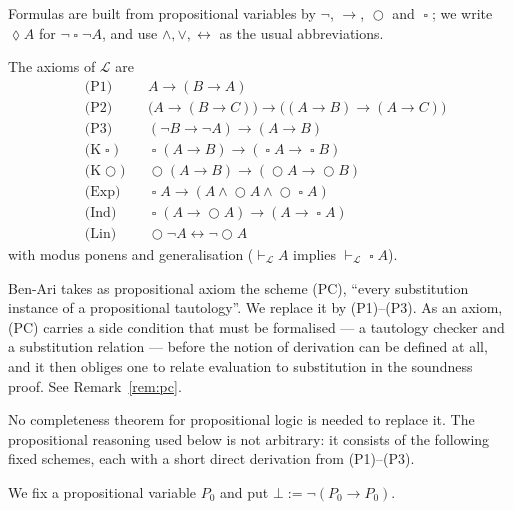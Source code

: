 \documentclass[11pt,a4paper]{article}
\theoremstyle{definition}
\newcommand{\Next}{\mathop{\bigcirc}}
\newcommand{\Always}{\mathop{\square}}
\newcommand{\Event}{\mathop{\lozenge}}
\newcommand{\proves}{\vdash_{\mathcal{L}}}
\begin{document}
Formulas are built from propositional variables by $\neg$, $\to$, $\Next$ and
$\Always$; we write $\Event A$ for $\neg\Always\neg A$, and use
$\wedge,\vee,\leftrightarrow$ as the usual abbreviations.

The axioms of $\mathcal{L}$ are
\begin{align*}
&\text{(P1)}   && A\to(B\to A)\\
&\text{(P2)}   && \bigl(A\to(B\to C)\bigr)\to\bigl((A\to B)\to(A\to C)\bigr)\\
&\text{(P3)}   && (\neg B\to\neg A)\to(A\to B)\\
&\text{(K}\Always) && \Always(A\to B)\to(\Always A\to\Always B)\\
&\text{(K}\Next)   && \Next(A\to B)\to(\Next A\to\Next B)\\
&\text{(Exp)}  && \Always A\to (A\wedge \Next A\wedge \Next\Always A)\\
&\text{(Ind)}  && \Always(A\to\Next A)\to(A\to\Always A)\\
&\text{(Lin)}  && \Next\neg A\leftrightarrow\neg\Next A
\end{align*}
with modus ponens and generalisation ($\proves A$ implies $\proves\Always A$).

Ben-Ari takes as propositional axiom the scheme (PC), ``every substitution
instance of a propositional tautology''.  We replace it by (P1)--(P3).  As an
axiom, (PC) carries a side condition that must be formalised --- a tautology
checker and a substitution relation --- before the notion of derivation can be
defined at all, and it then obliges one to relate evaluation to substitution in
the soundness proof.  See Remark~\ref{rem:pc}.

No completeness theorem for propositional logic is needed to replace it.  The
propositional reasoning used below is not arbitrary: it consists of the
following fixed schemes, each with a short direct derivation from (P1)--(P3).

We fix a propositional variable $P_0$ and put $\bot:=\neg(P_0\to P_0)$.
\end{document}
